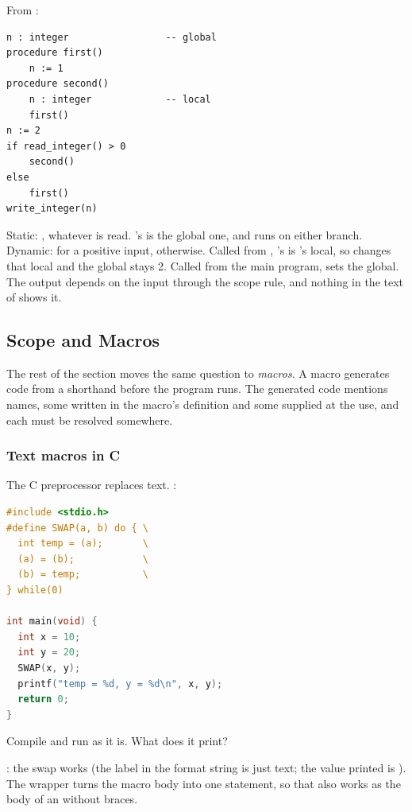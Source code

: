 \begin{exercise}
From \cite[Chapter~3]{Scott}:
\begin{lstlisting}[style=repl]
n : integer                 -- global
procedure first()
    n := 1
procedure second()
    n : integer             -- local
    first()
n := 2
if read_integer() > 0
    second()
else
    first()
write_integer(n)
\end{lstlisting}
\end{exercise}
\begin{solution}
Static: , whatever is read. 's  is the global one, and  runs on either branch. Dynamic:  for a positive input,  otherwise. Called from , 's  is 's local, so  changes that local and the global stays 2. Called from the main program,  sets the global. The output depends on the input through the scope rule, and nothing in the text of  shows it.
\end{solution}

\subsection{Scope and Macros}

The rest of the section moves the same question to \emph{macros}. A macro generates code from a shorthand before the program runs. The generated code mentions names, some written in the macro's definition and some supplied at the use, and each must be resolved somewhere.

\subsubsection{Text macros in C} The C preprocessor replaces text. :
\begin{lstlisting}[language=C]
#include <stdio.h>
#define SWAP(a, b) do { \
  int temp = (a);       \
  (a) = (b);            \
  (b) = temp;           \
} while(0)

int main(void) {
  int x = 10;
  int y = 20;
  SWAP(x, y);
  printf("temp = %d, y = %d\n", x, y);
  return 0;
}
\end{lstlisting}

\begin{exercise}
Compile and run \code{unhygenic.c} as it is. What does it print?
\end{exercise}
\begin{solution}
\code{temp = 20, y = 10}: the swap works (the label  in the format string is just text; the value printed is ). The  wrapper turns the macro body into one statement, so that  also works as the body of an  without braces.
\end{solution}

